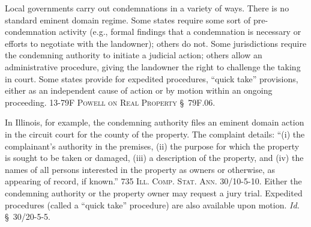 Local governments carry out condemnations in a variety of ways. There is no
standard eminent domain regime. Some states require some sort of
pre-condemnation activity (e.g., formal findings that a condemnation is
necessary or efforts to negotiate with the landowner); others do not. Some
jurisdictions require the condemning authority to initiate a judicial action;
others allow an administrative procedure, giving the landowner the right to
challenge the taking in court. Some states provide for expedited procedures,
``quick take'' provisions, either as an independent cause of action or by motion
within an ongoing proceeding. 13-79F \textsc{Powell on Real Property} \S~79F.06.

In Illinois, for example, the condemning authority files an eminent domain
action in the circuit court for the county of the property. The complaint
details: ``(i) the complainant's authority in the premises, (ii) the purpose for
which the property is sought to be taken or damaged, (iii) a description of the
property, and (iv) the names of all persons interested in the property as owners
or otherwise, as appearing of record, if known.'' 735 \textsc{Ill. Comp. Stat.
Ann.} 30/10-5-10. Either the condemning authority or the property owner may
request a jury trial. Expedited procedures (called a ``quick take'' procedure)
are also available upon motion. \textit{Id.} \S~30/20-5-5.

